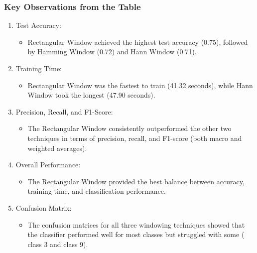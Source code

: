 \documentclass[a4paper,12pt]{article}
\begin{document}
        \subsubsection{Key Observations from the Table}
            \begin{enumerate}
                \item Test Accuracy:
                    \begin{itemize}
                        \item Rectangular Window achieved the highest test accuracy (0.75), followed by Hamming Window (0.72) and Hann Window (0.71).
                    \end{itemize}
                \item Training Time:
                    \begin{itemize}
                        \item Rectangular Window was the fastest to train (41.32 seconds), while Hann Window took the longest (47.90 seconds).
                    \end{itemize}
                \item Precision, Recall, and F1-Score:
                    \begin{itemize}
                        \item The Rectangular Window consistently outperformed the other two techniques in terms of precision, recall, and F1-score (both macro and weighted averages).
                    \end{itemize}
                \item Overall Performance:
                    \begin{itemize}
                        \item The Rectangular Window provided the best balance between accuracy, training time, and classification performance.
                    \end{itemize}
                \item Confusion Matrix:
                    \begin{itemize}
                        \item The confusion matrices for all three windowing techniques showed that the classifier performed well for most classes but struggled with some ( class 3 and class 9).
                    \end{itemize}
            \end{enumerate}
\newpage
\end{document}

